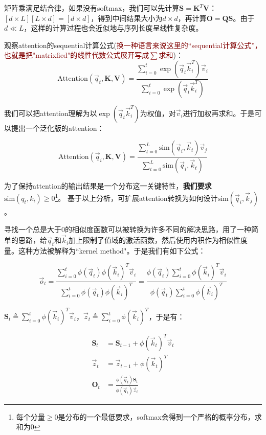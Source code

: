矩阵乘满足结合律，如果没有softmax，我们可以先计算$\mathbf{S} = \mathbf{K}^T \mathbf{V}$： $[d \times L] [L \times d] = [d \times d]$，得到中间结果大小为$d\times d$，再计算$\mathbf{O} = \mathbf{Q}\mathbf{S}$。由于$d \ll L$，这样的计算过程也会近似地与序列长度呈线性复杂度。

观察attention的sequential计算公式(\textcolor{maroon}{换一种语言来说这里的“sequential计算公式”，也就是把"matrixfied"的线性代数公式展开写成$\sum$求和})：
$$\text{Attention}(\vec{q}_t, \mathbf{K}, \mathbf{V}) = \frac{\sum_{i=0}^{t}\exp \left(\vec{q}_t \vec{k}_i^T\right)\vec{v}_i}{\sum_{i=0}^{t}\exp \left( \vec{q}_t \vec{k}_i^T \right)}$$

我们可以把attention理解为以$\exp \left( \vec{q}_t \vec{k}^T_i \right)$为权值，对$\vec{v}_i$进行加权再求和。于是可以提出一个泛化版的attention：

$$\text{Attention}\left( \vec{q}_i, \mathbf{K}, \mathbf{V} \right) = \frac{\sum_{t=0}^{L}\text{sim} \left(\vec{q}_i, \vec{k}_t \right) \vec{v}_j}{\sum_{t=0}^{L}\text{sim} \left( \vec{q}_i,\vec{k}_t \right)}$$

为了\textcolor{dkgreen}{保持attention的输出结果是一个分布这一关键特性，\textbf{我们要求$\text{sim}(q_t,k_i)\ge 0$}}\footnote{每个分量$\ge 0$是分布的一个最低要求，softmax会得到一个严格的概率分布，求和为0}{。}
基于以上分析，可扩展attention转换为如何设计$\text{sim}\left( \vec{q}_i, \vec{k}_j \right)$。

寻找一个总是大于0的相似度函数可以被转换为许多不同的解决思路，\cite{katharopoulos2020transformers}用了一种简单的思路，给$\vec{q}_t$和$\vec{k}_i$加上限制了值域的激活函数，然后使用内积作为相似性度量。这种方法被解释为“kernel method"。于是我们有如下公式：

$$\vec{o}_t = \frac{\sum_{i=0}^{t}\phi \left( \vec{q}_t \right)\phi \left(\vec{k}_i \right)^T \vec{v}_i}{\sum_{i=0}^{t}\phi \left(\vec{q}_t \right) \phi \left( \vec{k}_i\right)^T} = \frac{\phi \left( \vec{q}_t \right) \sum_{i=0}^{t}\phi \left( \vec{k}_i \right)^T \vec{v}_i}{\phi \left(\vec{q}_t\right) \sum_{i=0}^{t} \phi \left(\vec{k}_i \right)^T}$$

$\mathbf{S}_t \triangleq \sum_{i=0}^{t} \phi \left( \vec{k}_i \right)^T\vec{v}_i$，$\vec{z}_t \triangleq \sum_{i=0}^{t} \phi \left(\vec{k}_i\right)^T$，于是有：

\begin{align}
\mathbf{S}_t &= \mathbf{S}_{t-1} + \phi \left( \vec{k}_t \right)^T\vec{v}_t \nonumber\\
\vec{z}_t &= \vec{z}_{t-1} + \phi \left( \vec{k}_t \right)^T \nonumber \\
\mathbf{O}_t &= \frac{\phi \left( \vec{q}_t \right) \mathbf{S}_t}{\phi \left( \vec{q}_t \right) \vec{z}_t} \label{eq:linear-attn1}
\end{align}

